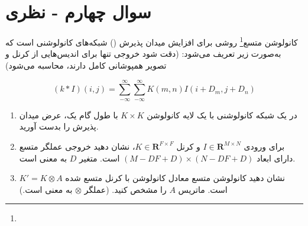 \section{سوال چهارم - نظری}

کانولوشن متسع\footnote{} روشی برای افزایش میدان پذیرش () شبکه‌های کانولوشنی است که به‌صورت زیر تعریف می‌شود: (دقت شود خروجی تنها برای اندیس‌هایی از کرنل و تصویر همپوشانی کامل دارند، محاسبه می‌شود)

$$ (k \ast I)(i, j)=\sum_{-\infty}^{\infty}\sum_{-\infty}^{\infty} K(m,n)I(i+D_m, j+D_n) $$



\begin{enumerate}
	\item در یک شبکه کانولوشنی با یک لایه کانولوشن $K\times K$ با طول گام یک، عرض میدان پذیرش را بدست آورید.
	\item برای ورودی 
	$I \in \mathbf{R}^{M\times N}$
	و کرنل
	$K \in \mathbf{R}^{F\times F}$،
		نشان دهید خروجی عملگر متسع دارای ابعاد 
	$(M-DF+D)\times (N-DF+D)$
	است. متغیر $D$ به معنی  است.
	\item نشان دهید کانولوشن متسع معادل کانولوشن با کرنل متسع شده 
	$K'=K \otimes A$ 
	است. ماتریس $A$ را مشخص کنید. (عملگر $\otimes$ به معنی   است.)
\end{enumerate}

















